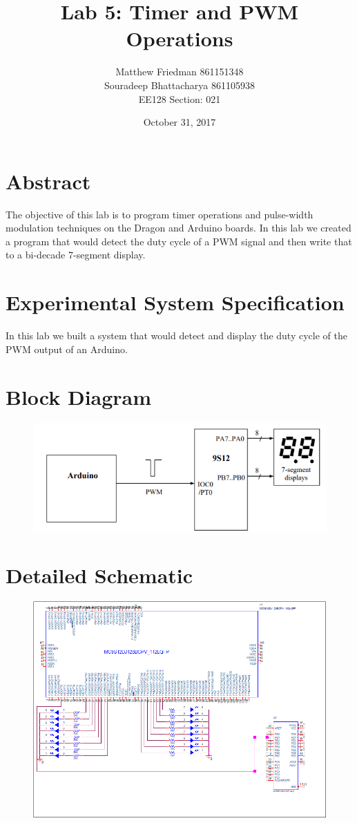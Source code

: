\documentclass{article}
\title{Lab 5: Timer and PWM Operations}
\date{October 31, 2017}
\author{Matthew Friedman 861151348\\Souradeep Bhattacharya 861105938\\EE128 Section: 021}
\begin{document}
	\maketitle
	\section*{Abstract}
	The objective of this lab is to program timer operations and pulse-width modulation techniques on the Dragon and Arduino boards. In this lab we created a program that would detect the duty cycle of a PWM signal and then write that to a bi-decade 7-segment display.
	\section*{Experimental System Specification}
	In this lab we built a system that would detect and display the duty cycle of the PWM output of an Arduino.
	\section*{Block Diagram}
	\begin{figure}[H]
		\centering
		\includegraphics[width=1\textwidth]{Block_Diagram}
	\end{figure}
	\section*{Detailed Schematic}
	\begin{figure}[H]
		\centering
		\includegraphics[width=1\textwidth]{Diagram}
	\end{figure}
\end{document}

